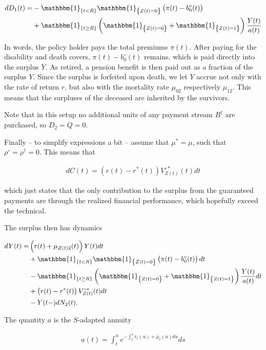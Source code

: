\documentclass{book}
\newcommand{\1}[1]{\mathbbm{1}_{\left\lbrace #1 \right\rbrace}}
\theoremstyle{break}
\theoremstyle{remark}
\numberwithin{equation}{section}
\begin{document}
\begin{align*}
	dD_1(t) =& - \1{t<R} \1{Z(t)=0} \left( \pi(t) - b_0^\circ(t) \right) \\
	&+ \1{t \geq R} \left( \1{Z(t)=0} + \1{Z(t)=1} \right) \frac{Y(t)}{a(t)}
\end{align*}

In words, the policy holder pays the total premiums $\pi(t)$. After paying for the disability and death covers, $\pi(t) - b_0^\circ(t)$ remains, which is paid directly into the surplus $Y$. As retired, a pension benefit is then paid out as a fraction of the surplus $Y$. Since the surplus is forfeited upon death, we let $Y$ accrue not only with the rate of return $r$, but also with the mortality rate $\mu_{02}$ respectively $\mu_{12}$. This means that the surpluses of the deceased are inherited by the survivors.

Note that in this setup no additional units of any payment stream $B^\dagger$ are purchased, so $D_2=Q=0$.

Finally -- to simplify expressions a bit -- assume that $\mu^*=\mu$, such that $\rho^\circ = \rho^\dagger = 0$. This means that

\begin{align*}
	dC(t) = \left( r(t) - r^*(t) \right) V_{Z(t)}^{\circ*}(t) dt
\end{align*}

which just states that the only contribution to the surplus from the guaranteed payments are through the realized financial performance, which hopefully exceed the technical.

The surplus then has dynamics

\begin{align} \label{YExampleDyn}
\begin{split}
		dY(t) =& \left( r(t) + \mu_{Z(t)2}(t) \right) Y(t) dt \\
	&+ \1{t<R} \1{Z(t)=0} \left(\pi(t) - b_0^\circ(t) \right) dt \\
	&- \1{t \geq R} \left( \1{Z(t)=0} + \1{Z(t)=1} \right) \frac{Y(t)}{a(t)} dt \\
	&+ \left( r(t) - r^*(t) \right) V_{Z(t)}^{\circ*}(t) dt \\
	&- Y(t-) dN_2(t).
\end{split}
\end{align}

The quantity $a$ is the $S$-adapted annuity

\begin{align*}
	a(t) = \int_t^n e^{-\int_t^s \bar{r}_t(u) + \bar{\mu}_t(u) du} ds
\end{align*}
\end{document}
